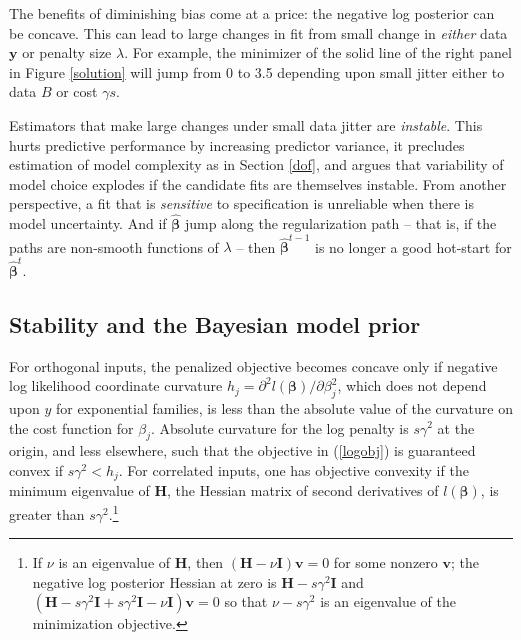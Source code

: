 \documentclass[12pt]{article}
\newcommand{\bs}[1]{\boldsymbol{#1}}
\newcommand{\bm}[1]{\mathbf{#1}}
\begin{document}
The benefits of diminishing bias come at a price: the negative log posterior
can be concave.  This can lead to large changes in fit from small change in
{\it either} data $\bm{y}$ or penalty size $\lambda$.  For example,  the
minimizer of the solid line of the right panel in Figure \ref{solution} will
jump from 0 to 3.5 depending upon small jitter either to data $B$ or cost
$\gamma s$.

Estimators that make large changes under small
data jitter are {\it instable}.  This hurts predictive performance by
increasing predictor variance, it precludes estimation of model complexity as
in Section \ref{dof}, and
\citet{breiman_heuristics_1996} argues that variability of model choice
explodes if the candidate fits are themselves instable. From another
perspective, a fit that is {\it sensitive} to specification is unreliable when
there is model uncertainty. And if $\bs{\hat\beta}$ jump along the
regularization path -- that is, if the paths are non-smooth functions of
$\lambda$ -- then $\bs{\hat\beta}^{t-1}$ is no longer a good hot-start for
$\bs{\hat\beta}^t$.


\subsection{Stability and the Bayesian model prior}

For orthogonal inputs, the penalized objective becomes concave only if
negative log likelihood coordinate curvature $h_j = \partial^2 l(\bs{\beta})/\partial
\beta_j^2$, which does not depend upon $y$ for exponential families, is less
than the absolute value of the curvature on the cost function for $\beta_j$.
Absolute curvature for the log penalty is $s\gamma^2$ at the origin, and less
elsewhere, such that  the objective in (\ref{logobj}) is guaranteed convex if
$s\gamma^2 < h_j$.  For correlated inputs, one has objective convexity if the
minimum eigenvalue of $\bm{H}$, the Hessian matrix of second derivatives of
$l(\bs{\beta})$, is greater than $s\gamma^2$.\footnote{ \noindent If $\nu$ is an
eigenvalue of $\bm{H}$, then $(\bm{H} -
\nu \bm{I})\bm{v} = 0$ for some nonzero $\bm{v}$; the negative log posterior
Hessian at zero is $\bm{H} - s\gamma^2\bm{I}$ and $(\bm{H} - s\gamma^2\bm{I} + s\gamma^2\bm{I} -
\nu \bm{I})\bm{v} = 0$ so that 
$\nu - s\gamma^2$ is an eigenvalue of the minimization objective.}
\end{document}
